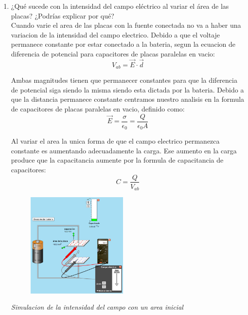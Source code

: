 \documentclass[12pt]{report}
\begin{document}
\begin{enumerate}
    \item ¿Qué sucede con la intensidad del campo eléctrico al variar el área de las placas? ¿Podrías explicar por qué?\\

    Cuando varie el area de las placas con la fuente conectada no va a haber una variacion de la intensidad del campo electrico. Debido a que el voltaje permanece constante por estar conectado a la bateria, segun la ecuacion de diferencia de potencial para capacitores de placas paralelas en vacio:\\

    \[V_{ab}=\vec{E} \cdot \vec{d}\]

    Ambas magnitudes tienen que permanecer constantes para que la diferencia de potencial siga siendo la misma siendo esta dictada por la bateria. Debido a que la distancia permanece constante centramos nuestro analisis en la formula de capacitores de placas paralelas en vacio, definido como:\\

    \[\vec{E}=\frac{\sigma}{\epsilon_0}=\frac{Q}{\epsilon_0 A}\]

    Al variar el area la unica forma de que el campo electrico permanezca constante es aumentando adecuadamente la carga. Ese aumento en la carga produce que la capacitancia aumente por la formula de capacitancia de capacitores:\\


    \[C=\frac{Q}{V_{ab}}\]

    \newpage

\begin{figure}[h]
    \centering
    \includegraphics[width=0.475\textwidth]{./images/2FOTO1.png}
\end{figure}
    \textit{Simulacion de la intensidad del campo con un area inicial}\\



\end{enumerate}
\end{document}
